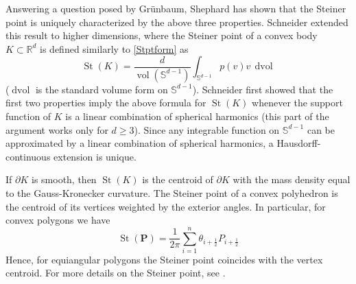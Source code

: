 \documentclass[12pt]{article}
\newcommand{\R}{\mathbb {R}}
\renewcommand{\P}{\mathbf{P}}
\newcommand{\St}{\operatorname{St}}
\newcommand{\vol}{\operatorname{vol}}
\newcommand{\dvol}{\operatorname{dvol}}
\newcommand{\Sph}{\mathbb{S}}
\begin{document}
Answering a question posed by Gr\"unbaum, Shephard \cite{Sh0} has shown that the Steiner point is uniquely characterized by the above three properties. Schneider \cite{Sch0} extended this result to higher dimensions, where the Steiner point of a convex body $K \subset \R^d$ is defined similarly to \eqref{Stptform} as
\[
\St(K) = \frac{d}{\vol(\Sph^{d-1})} \int_{\Sph^{d-1}} p(v) v\, \dvol
\]
($\dvol$ is the standard volume form on $\Sph^{d-1}$).
Schneider first showed that the first two properties imply the above formula for $\St(K)$ whenever the support function of $K$ is a linear combination of spherical harmonics (this part of the argument works only for $d \ge 3$). Since any integrable function on $\Sph^{d-1}$ can be approximated by a linear combination of spherical harmonics, a Hausdorff-continuous extension is unique.

If $\partial K$ is smooth, then $\St(K)$ is the centroid of $\partial K$ with the mass density equal to the Gauss-Kronecker curvature. The Steiner point of a convex polyhedron is the centroid of its vertices weighted by the exterior angles. In particular, for convex polygons we have
\begin{equation}
\label{eqn:StPointPolygon}
\St(\P) = \frac1{2\pi} \sum_{i=1}^n \theta_{i+\frac12} P_{i+\frac12}
\end{equation}
Hence, for equiangular polygons the Steiner point coincides with the vertex centroid. For more details on the Steiner point, see \cite{Gr0, Sch}.
\end{document}
